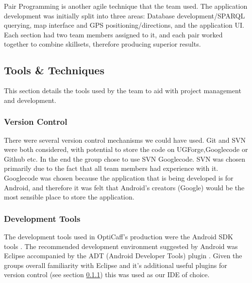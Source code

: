 Pair Programming is another agile technique that the team used. The application development was initially split into three areas: Database development/SPARQL querying, map interface and GPS positioning/directions, and the application UI. Each section had two team members assigned to it, and each pair worked together to combine skillsets, therefore producing superior results. 

\subsection{Tools \& Techniques}
This section details the tools used by the team to aid with project management and development.

\subsubsection{Version Control}
\label{sec:VersionControl}
There were several version control mechanisms we could have used. Git and SVN were both considered, with potential to store the code on UGForge,Googlecode or Github etc. In the end the group chose to use SVN Googlecode. SVN was chosen primarily due to the fact that all team members had experience with it. Googlecode was chosen because the application that is being developed is for Android, and therefore it was felt that Android’s creators (Google) would be the most sensible place to store the application. 

\subsubsection{Development Tools}
The development tools used in OptiCaff's production were the Android SDK tools \cite{AndroidSDK}. The recommended development environment suggested by Android was Eclipse \cite{Eclipse} accompanied by the ADT (Android Developer Tools) plugin \cite{SDKAllOS}. Given the groups overall familiarity with Eclipse and it’s additional useful plugins for version control (see section \ref{sec:VersionControl}) this was used as our IDE of choice.